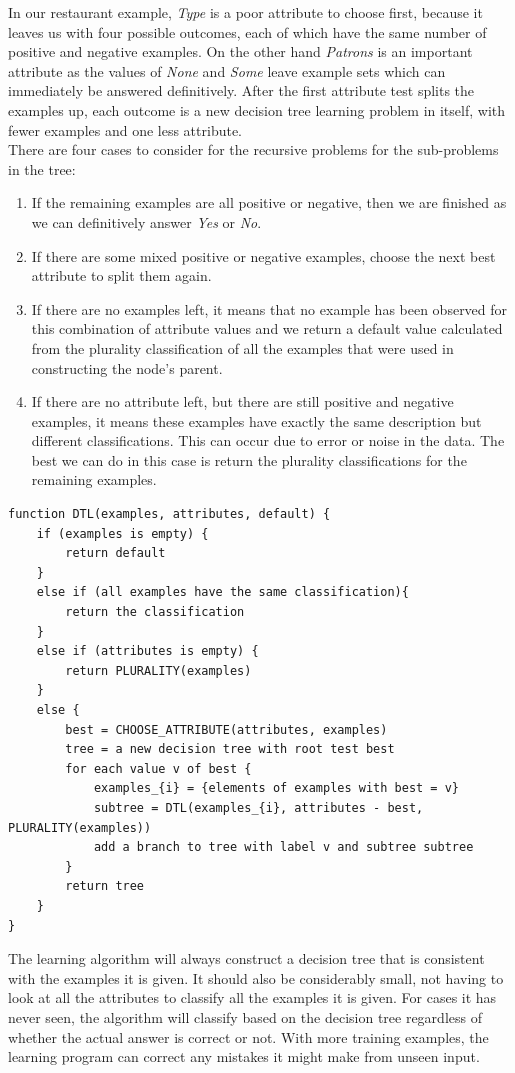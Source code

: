 \documentclass{article}
\newcommand{\n}[0]{\\[\baselineskip]}
\begin{document}
\noindent
In our restaurant example, \textit{Type} is a poor attribute to choose first, because it leaves us with four possible outcomes, each of which have the same number of positive and negative examples. On the other hand \textit{Patrons} is an important attribute as the values of \textit{None} and \textit{Some} leave example sets which can immediately be answered definitively. After the first attribute test splits the examples up, each outcome is a new decision tree learning problem in itself, with fewer examples and one less attribute. 
\n
There are four cases to consider for the recursive problems for the sub-problems in the tree:
\begin{enumerate}
\item If the remaining examples are all positive or negative, then we are finished as we can definitively answer \textit{Yes} or \textit{No}. 
\item If there are some mixed positive or negative examples, choose the next best attribute to split them again.
\item If there are no examples left, it means that no example has been observed for this combination of attribute values and we return a default value calculated from the plurality classification of all the examples that were used in constructing the node's parent. 
\item If there are no attribute left, but there are still positive and negative examples, it means these examples have exactly the same description but different classifications. This can occur due to error or noise in the data. The best we can do in this case is return the plurality classifications for the remaining examples.
\end{enumerate}
\begin{lstlisting}[caption={Decision tree learning algorithm}, label=algo:dtl]
function DTL(examples, attributes, default) {
	if (examples is empty) {
		return default
	}
	else if (all examples have the same classification){
		return the classification
	}
	else if (attributes is empty) {
		return PLURALITY(examples)
	}
	else {
		best = CHOOSE_ATTRIBUTE(attributes, examples)
		tree = a new decision tree with root test best
		for each value v of best {
			examples_{i} = {elements of examples with best = v}
			subtree = DTL(examples_{i}, attributes - best, PLURALITY(examples))
			add a branch to tree with label v and subtree subtree
		}
		return tree
	}
}
\end{lstlisting}
The learning algorithm will always construct a decision tree that is consistent with the examples it is given. It should also be considerably small, not having to look at all the attributes to classify all the examples it is given. For cases it has never seen, the algorithm will classify based on the decision tree regardless of whether the actual answer is correct or not. With more training examples, the learning program can correct any mistakes it might make from unseen input.
\end{document}
